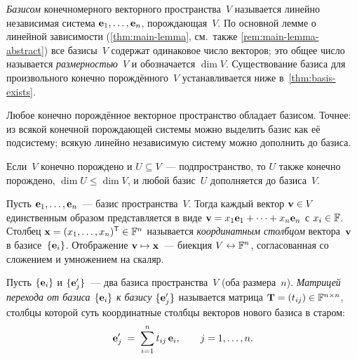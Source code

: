 \begin{definition}
\label{def:basis-dim}
\emph{Базисом} конечномерного векторного пространства~$V$ называется
линейно независимая система $\mathbf{e}_1, \dots, \mathbf{e}_n$,
порождающая~$V$. По основной лемме о линейной зависимости
(\cref{thm:main-lemma}, см.\ также \cref{rem:main-lemma-abstract})
все базисы~$V$ содержат одинаковое число векторов; это общее число
называется \emph{размерностью}~$V$ и обозначается $\dim V$.
Существование базиса для произвольного конечно порождённого~$V$
устанавливается ниже в~\cref{thm:basis-exists}.
\end{definition}

\begin{theorem}
\label{thm:basis-exists}
Любое конечно порождённое векторное пространство обладает базисом.
Точнее: из всякой конечной порождающей системы можно выделить базис как
её подсистему; всякую линейно независимую систему можно дополнить до
базиса.
\end{theorem}

\begin{corollary}
\label{cor:subspace-fg}
Если~$V$ конечно порождено и $U \subseteq V$~--- подпространство, то
$U$ также конечно порождено, $\dim U \le \dim V$, и любой базис~$U$
дополняется до базиса~$V$.
\end{corollary}

\begin{theorem}
\label{thm:coordinates}
Пусть $\mathbf{e}_1, \dots, \mathbf{e}_n$~--- базис пространства~$V$. Тогда
каждый вектор $\mathbf{v} \in V$ единственным образом представляется в
виде $\mathbf{v} = x_1 \mathbf{e}_1 + \dots + x_n \mathbf{e}_n$ с
$x_i \in \mathbb{F}$. Столбец $\mathbf{x} = (x_1, \dots, x_n)^{\mathsf{T}} \in \mathbb{F}^n$
называется \emph{координатным столбцом} вектора~$\mathbf{v}$ в
базисе~$\{\mathbf{e}_i\}$. Отображение $\mathbf{v} \mapsto \mathbf{x}$~---
биекция $V \leftrightarrow \mathbb{F}^n$, согласованная со сложением и
умножением на скаляр.
\end{theorem}

\begin{definition}
\label{def:transition-matrix}
Пусть $\{\mathbf{e}_i\}$ и $\{\mathbf{e}'_j\}$~--- два базиса
пространства~$V$ (оба размера~$n$). \emph{Матрицей перехода от базиса
$\{\mathbf{e}_i\}$ к базису $\{\mathbf{e}'_j\}$} называется матрица
$\mathbf{T} = (t_{ij}) \in \mathbb{F}^{n \times n}$, столбцы которой суть
координатные столбцы векторов нового базиса в старом:
\[
  \mathbf{e}'_j \;=\; \sum_{i=1}^{n} t_{ij}\,\mathbf{e}_i,
  \qquad j = 1, \dots, n.
\]
\end{definition}

